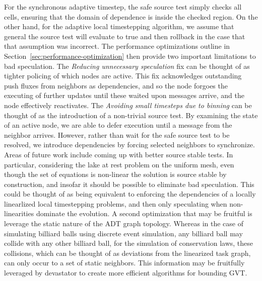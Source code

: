 For the synchronous adaptive timestep, the safe source test simply checks all cells, ensuring that the domain of dependence is inside the checked region. On the other hand, for the adaptive local timestepping algorithm, we assume that general the source test will evaluate to true and then rollback in the case that that assumption was incorrect. The performance optimizations outline in Section~\ref{sec:performance-optimization} then provide two important limitations to bad speculation. The {\em Reducing unnecessary speculation} fix can be thought of as tighter policing of which nodes are active. This fix acknowledges outstanding push fluxes from neighbors as dependencies, and so the node forgoes the executing of further updates until these waited upon messages arrive, and the node effectively reactivates. The {\em Avoiding small timesteps due to binning} can be thought of as the introduction of a non-trivial source test. By examining the state of an active node, we are able to defer execution until a message from the neighbor arrives. However, rather than wait for the safe source test to be resolved, we introduce dependencies by forcing selected neighbors to synchronize. 
Areas of future work include coming up with better source stable tests. In particular, considering the lake at rest problem on the uniform mesh, even though the set of equations is non-linear the solution is source stable by construction, and insofar it should be possible to eliminate bad speculation. This could be thought of as being equivalent to enforcing the dependencies of a locally linearlized local timestepping problems, and then only speculating when non-linearities dominate the evolution. A second optimization that may be fruitful is leverage the static nature of the ADT graph topology. Whereas in the case of simulating billiard balls using discrete event simulation, any billiard ball may collide with any other billiard ball, for the simulation of conservation laws, these collisions, which can be thought of as deviations from the linearized task graph, can only occur to a set of static neighbors. This information may be fruitfully leveraged by devastator to create more efficient algorithms for bounding GVT.

